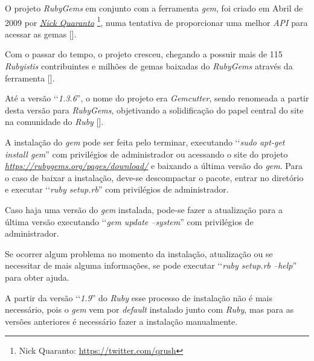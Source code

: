 O projeto \emph{RubyGems} em conjunto com a ferramenta \emph{gem}, foi criado em Abril de 2009 por
\emph{\href{https://twitter.com/qrush}{Nick Quaranto}} \footnote{Nick Quaranto: \url{https://twitter.com/qrush}},
numa tentativa de proporcionar uma melhor \emph{API} para acessar as gemas [].

Com o passar do tempo, o projeto cresceu, chegando a possuir mais de 115 \emph{Rubyistis} contribuintes e
milhões de gemas baixadas do \emph{RubyGems} através da ferramenta [].

Até a versão ‘‘\emph{1.3.6}'', o nome do projeto era \emph{Gemcutter}, sendo renomeada a partir desta versão
para \emph{RubyGems}, objetivando a solidificação do papel central do site na comunidade do \emph{Ruby}
[].

A instalação do \emph{gem} pode ser feita pelo terminar, executando ‘‘\emph{sudo apt-get install gem}'' com
privilégios de administrador ou acessando o site do projeto
\emph{\href{RubyGems}{https://rubygems.org/pages/download/}} e baixando a última
versão do \emph{gem}. Para o caso de baixar a instalação, deve-se descompactar o pacote, entrar
no diretório e executar ‘‘\emph{ruby setup.rb}'' com privilégios de administrador.

Caso haja uma versão do \emph{gem} instalada, pode-se fazer a atualização para a última versão executando
‘‘\emph{gem update --system}'' com privilégios de administrador.

Se ocorrer algum problema no momento da instalação, atualização ou se necessitar de mais
alguma informações, se pode executar ‘‘\emph{ruby setup.rb --help}'' para obter ajuda.

A partir da versão ‘‘\emph{1.9}'' do \emph{Ruby} esse processo de instalação não é mais necessário, pois o
\emph{gem} vem por \emph{default} instalado junto com \emph{Ruby}, mas para as versões anteriores
é necessário fazer a instalação manualmente.